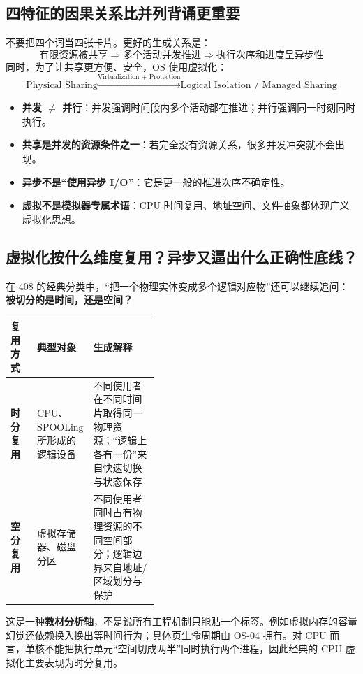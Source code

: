 \documentclass[11pt,a4paper]{ctexart}
\newcommand{\kw}[1]{\textbf{#1}}
\begin{document}
\subsection{四特征的因果关系比并列背诵更重要}

不要把四个词当四张卡片。更好的生成关系是：
\[
\boxed{
\text{有限资源被共享}
\Rightarrow
\text{多个活动并发推进}
\Rightarrow
\text{执行次序和进度呈异步性}
}
\]
同时，为了让共享更方便、安全，OS 使用虚拟化：
\[
\boxed{
\text{Physical Sharing}
\xrightarrow{\text{Virtualization + Protection}}
\text{Logical Isolation / Managed Sharing}
}
\]

\begin{exam}[边界辨析]
\begin{itemize}
  \item \kw{并发 $\neq$ 并行}：并发强调时间段内多个活动都在推进；并行强调同一时刻同时执行。
  \item \kw{共享是并发的资源条件之一}：若完全没有资源关系，很多并发冲突就不会出现。
  \item \kw{异步不是“使用异步 I/O”}：它是更一般的推进次序不确定性。
  \item \kw{虚拟不是模拟器专属术语}：CPU 时间复用、地址空间、文件抽象都体现广义虚拟化思想。
\end{itemize}
\end{exam}

\subsection{虚拟化按什么维度复用？异步又逼出什么正确性底线？}

在 408 的经典分类中，“把一个物理实体变成多个逻辑对应物”还可以继续追问：\kw{被切分的是时间，还是空间？}

\begin{center}
\small
\renewcommand{\arraystretch}{1.25}
\begin{tabularx}{\linewidth}{>{\bfseries}p{0.18\linewidth} p{0.24\linewidth} X}
\toprule
复用方式 & 典型对象 & 生成解释\\
\midrule
时分复用 & CPU、SPOOLing 所形成的逻辑设备 & 不同使用者在不同时间片取得同一物理资源；“逻辑上各有一份”来自快速切换与状态保存\\
空分复用 & 虚拟存储器、磁盘分区 & 不同使用者同时占有物理资源的不同空间部分；逻辑边界来自地址/区域划分与保护\\
\bottomrule
\end{tabularx}
\end{center}

这是一种\kw{教材分析轴}，不是说所有工程机制只能贴一个标签。例如虚拟内存的容量幻觉还依赖换入换出等时间行为；具体页生命周期由 OS-04 拥有。对 CPU 而言，单核不能把执行单元“空间切成两半”同时执行两个进程，因此经典的 CPU 虚拟化主要表现为时分复用。
\end{document}
